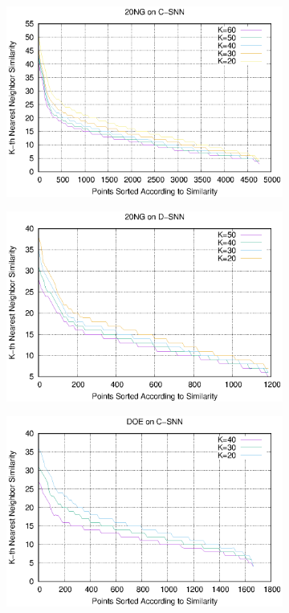 \documentclass[preprint,12pt,authoryear,review]{elsarticle}
\begin{document}
\begin{figure}[!htbp]
    \centering
    \begin{subfigure}[b]{0.37\textwidth}
        \includegraphics[width=\textwidth]{20NG_C-SNN.eps}
        \label{fig:20ng_tun_csnn}
    \end{subfigure}
    \begin{subfigure}[b]{0.37\textwidth}
        \includegraphics[width=\textwidth]{20NG_D-SNN.eps}
        \label{fig:20ng_tun_dsnn}
    \end{subfigure}
       \begin{subfigure}[b]{0.37\textwidth}
        \includegraphics[width=\textwidth]{DOE_C-SNN.eps}

\end{subfigure}
\end{figure}
\end{document}
